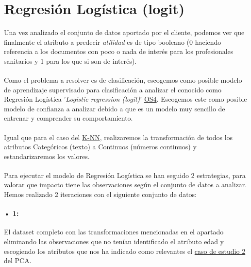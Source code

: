 \section{Regresión Logística (logit)}
\label{section:lr}

\paragraph{}
Una vez analizado el conjunto de datos aportado por el cliente, podemos ver que finalmente el atributo a predecir \textit{utilidad} es de tipo booleano (0 haciendo referencia a los documentos con poco o nada de interés para los profesionales sanitarios y 1 para los que si son de interés).

\paragraph{}
Como el problema a resolver es de clasificación, escogemos como posible modelo de aprendizaje supervisado para clasificación a analizar el conocido como Regresión Logística '\textit{Logistic regression (logit)}'\cite{ref:lr_def} \hyperref[os:OS4]{OS4}. Escogemos este como posible modelo de confianza a analizar debido a que es un modelo muy sencillo de entrenar y comprender su comportamiento\cite{ref:lr_understanding}.

\paragraph{}
Igual que para el caso del \hyperref[section:knn]{K-NN}, realizaremos la transformación de todos los atributos Categóricos (texto) a Continuos (números continuos) y estandarizaremos los valores.

\paragraph{}
Para ejecutar el modelo de Regresión Logística se han seguido 2 estrategias, para valorar que impacto tiene las observaciones según el conjunto de datos a analizar. Hemos realizado 2 iteraciones con el siguiente conjunto de datos:

\label{section:lr_casos}
\paragraph{• 1: } El dataset completo con las transformaciones mencionadas en el apartado  eliminando las observaciones que no tenían identificado el atributo edad y escogiendo los atributos que nos ha indicado como relevantes el \hyperref[result:pca_case2]{caso de estudio 2} del PCA.

